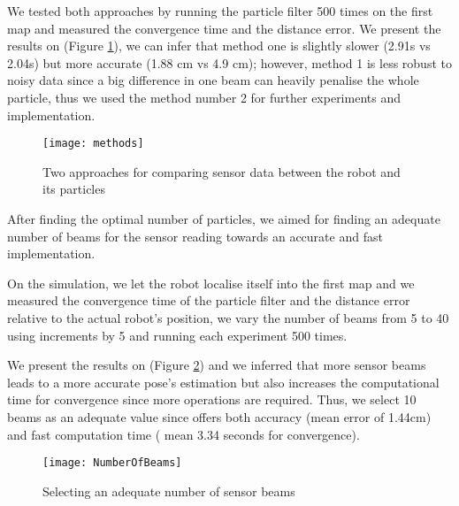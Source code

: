 	We tested both approaches by running the particle filter 500 times on the first map  and measured the convergence time and the distance error. We present the results on (Figure \ref{fig:methods}), we can infer that method one is slightly slower (2.91s vs 2.04s) but more accurate (1.88 cm vs 4.9 cm); however, method 1 is less robust to noisy data since a big difference in one beam can heavily penalise the whole particle, thus we used the method number 2 for further experiments and implementation. 
	

	\begin{figure}[h]
		\centering
		\texttt{[image: methods]}
		\caption{Two approaches for comparing sensor data between the robot and its particles}
		\label{fig:methods}
	\end{figure}
	
	
	
	After finding the optimal number of particles, we aimed for finding an adequate number of beams for the sensor reading towards an accurate and fast implementation.
	
	On the simulation, we let the robot localise itself into the first map and we measured the convergence time of the particle filter and the distance error relative to the actual robot's position, we vary the number of beams from 5 to 40 using increments by 5 and running each experiment 500 times. 
	
	We present the results on (Figure \ref{fig:NumBeams}) and we  inferred that more sensor beams leads to a more accurate pose's estimation but also increases the computational time for convergence since more operations are required. Thus, we select 10 beams as an adequate value since offers both accuracy (mean error of 1.44cm) and fast computation time ( mean 3.34 seconds for convergence).  
	
	\begin{figure}[h]
    \centering
		\texttt{[image: NumberOfBeams]}
      \caption{Selecting an adequate number of sensor beams}
    \label{fig:NumBeams}
 	\end{figure}
	
	
	 

	
	